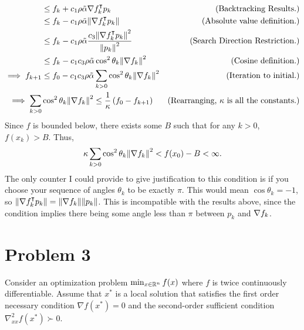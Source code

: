 \begin{solution}
\begin{align*}
        &\leq f_k + c_1\rho\Tilde{\alpha}\nabla f_k^\intercal p_k &\text{(Backtracking Results.)}\\
        &\leq f_k - c_1\rho\Tilde{\alpha}\norm{\nabla f_k^\intercal p_k} &\text{(Absolute value definition.)}\\
        &\leq f_k - c_1\rho\Tilde{\alpha}\frac{c_3 \norm{\nabla f_k^\intercal p_k}^2}{\norm{p_k}^2} &\text{(Search Direction Restriction.)}\\
        &\leq f_k - c_1c_3\rho\Tilde{\alpha} \cos^2\theta_k \norm{\nabla f_k}^2 &\text{(Cosine definition.)}\\
        \implies f_{k+1} &\leq f_0 - c_1c_3\rho\Tilde{\alpha} \sum_{k > 0} \cos^2\theta_k \norm{\nabla f_k}^2 &\text{(Iteration to initial.)}\\
        \implies \sum_{k > 0}& \cos^2\theta_k \norm{\nabla f_k}^2 \leq \frac{1}{\kappa}\left( f_0 - f_{k+1}\right) &\text{(Rearranging, $\kappa$ is all the constants.)} 
    \end{align*}
    \vspace{-6mm}\alignbreak
    Since $f$ is bounded below, there exists some $B$ such that for any $k > 0$, $f(x_k) > B$. Thus, 
    \[\kappa\sum_{k > 0} \cos^2\theta_k \norm{\nabla f_k}^2 < f(x_0) - B < \infty.\]
    The only counter I could provide to give justification to this condition is if you choose your sequence of angles $\theta_k$ to be exactly $\pi$. This would mean $\cos \theta_k = -1$, so $\norm{\nabla f_k^\intercal p_k} = \norm{\nabla f_k}\norm{p_k}$. This is incompatible with the results above, since the condition implies there being some angle less than $\pi$ between $p_k$ and $\nabla f_k$.
\end{solution}

\newpage
\section{Problem 3}
Consider an optimization problem $\min_{x \in \mathbb{R}^n} f(x)$ where $f$ is twice continuously differentiable. Assume that $x^*$ is a local solution that satisfies the first order necessary condition $\nabla f(x^*) = 0$ and the second-order sufficient condition $\nabla_{xx}^2f(x^*) \succ 0$.
